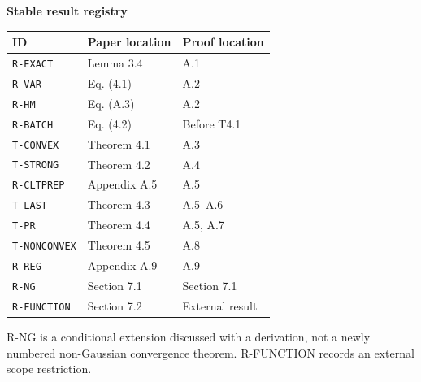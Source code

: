 \documentclass[10pt]{article}
\begin{document}
\begin{minipage}[t]{.49\linewidth}
\textbf{Stable result registry}\par\small
\begin{tabular}{@{}p{.22\linewidth}p{.32\linewidth}p{.35\linewidth}@{}}\toprule
ID & Paper location & Proof location \\\midrule
\texttt{R-EXACT} & Lemma 3.4 & A.1 \\
\texttt{R-VAR} & Eq. (4.1) & A.2 \\
\texttt{R-HM} & Eq. (A.3) & A.2 \\
\texttt{R-BATCH} & Eq. (4.2) & Before T4.1 \\
\texttt{T-CONVEX} & Theorem 4.1 & A.3 \\
\texttt{T-STRONG} & Theorem 4.2 & A.4 \\
\texttt{R-CLTPREP} & Appendix A.5 & A.5 \\
\texttt{T-LAST} & Theorem 4.3 & A.5--A.6 \\
\texttt{T-PR} & Theorem 4.4 & A.5, A.7 \\
\texttt{T-NONCONVEX} & Theorem 4.5 & A.8 \\
\texttt{R-REG} & Appendix A.9 & A.9 \\
\texttt{R-NG} & Section 7.1 & Section 7.1 \\
\texttt{R-FUNCTION} & Section 7.2 & External result \\
\bottomrule\end{tabular}\par
R-NG is a conditional extension discussed with a derivation, not a newly numbered non-Gaussian convergence theorem. R-FUNCTION records an external scope restriction.
\end{minipage}\hfill
\end{document}
